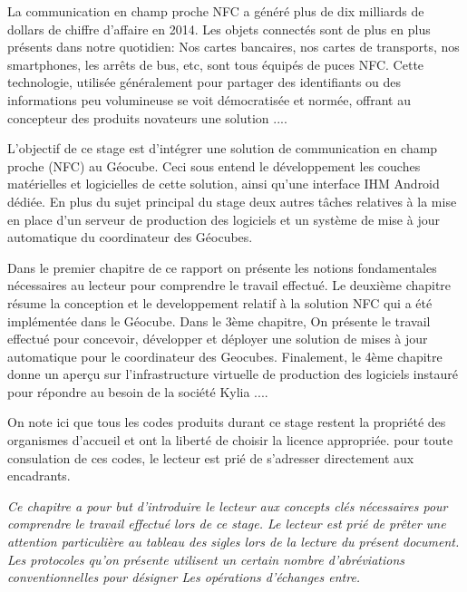 \documentclass{themeensg}
\begin{document}
  \vspace{1.5cm}
  
	La communication en champ proche NFC a généré plus de dix milliards de dollars de chiffre d'affaire en 2014. Les objets connectés sont de plus en plus présents dans notre quotidien: Nos cartes bancaires, nos cartes de transports, nos smartphones, les arrêts de bus, etc, sont tous équipés de puces NFC. Cette technologie, utilisée généralement pour partager des identifiants ou des informations peu volumineuse se voit démocratisée et normée, offrant au concepteur des produits novateurs une solution ....
	
	L'objectif de ce stage est d'intégrer une solution de communication en champ proche (NFC) au Géocube. Ceci sous entend le développement les couches matérielles et logicielles de cette solution, ainsi qu'une interface IHM Android dédiée. En plus du sujet principal du stage deux autres tâches relatives à la mise en place d'un serveur de production des logiciels et un système de mise à jour automatique du coordinateur des Géocubes.
	
	Dans le premier chapitre de ce rapport on présente les notions fondamentales nécessaires au lecteur pour comprendre le travail effectué. Le deuxième chapitre résume la conception et le developpement relatif à la solution NFC qui a été implémentée dans le Géocube. Dans le 3ème chapitre, On présente le travail effectué pour concevoir, développer et déployer une solution de mises à jour automatique pour le coordinateur des Geocubes. Finalement, le 4ème chapitre donne un aperçu sur l'infrastructure virtuelle de production des logiciels instauré pour répondre au besoin de la société Kylia ....
	
	 On note ici que tous les codes produits durant ce stage restent la propriété des organismes d'accueil et ont la liberté de choisir la licence appropriée. pour toute consulation de ces codes, le lecteur est prié de s'adresser directement aux encadrants.



\textit{ Ce chapitre a pour but d'introduire le lecteur aux concepts clés nécessaires pour comprendre le travail effectué lors de ce stage.
Le lecteur est prié de prêter une attention particulière au tableau des sigles lors de la lecture du présent document. Les protocoles qu'on présente utilisent un certain nombre d’abréviations conventionnelles pour désigner Les opérations d'échanges entre. }
\end{document}
